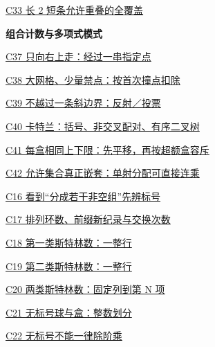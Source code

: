 \documentclass[10pt,a4paper]{article}
\begin{document}
\noindent\hyperref[C33]{C33 长 2 短条允许重叠的全覆盖\nobreak\hfill\pageref*{C33}}\par\vspace{1.5pt}
\par\vspace{3pt}\textbf{组合计数与多项式模式}\par
\noindent\hyperref[C37]{C37 只向右上走：经过一串指定点\nobreak\hfill\pageref*{C37}}\par\vspace{1.5pt}
\noindent\hyperref[C38]{C38 大网格、少量禁点：按首次撞点扣除\nobreak\hfill\pageref*{C38}}\par\vspace{1.5pt}
\noindent\hyperref[C39]{C39 不越过一条斜边界：反射／投票\nobreak\hfill\pageref*{C39}}\par\vspace{1.5pt}
\noindent\hyperref[C40]{C40 卡特兰：括号、非交叉配对、有序二叉树\nobreak\hfill\pageref*{C40}}\par\vspace{1.5pt}
\noindent\hyperref[C41]{C41 每盒相同上下限：先平移，再按超额盒容斥\nobreak\hfill\pageref*{C41}}\par\vspace{1.5pt}
\noindent\hyperref[C42]{C42 允许集合真正嵌套：单射分配可直接连乘\nobreak\hfill\pageref*{C42}}\par\vspace{1.5pt}
\noindent\hyperref[C16]{C16 看到“分成若干非空组”先辨标号\nobreak\hfill\pageref*{C16}}\par\vspace{1.5pt}
\noindent\hyperref[C17]{C17 排列环数、前缀新纪录与交换次数\nobreak\hfill\pageref*{C17}}\par\vspace{1.5pt}
\noindent\hyperref[C18]{C18 第一类斯特林数：一整行\nobreak\hfill\pageref*{C18}}\par\vspace{1.5pt}
\noindent\hyperref[C19]{C19 第二类斯特林数：一整行\nobreak\hfill\pageref*{C19}}\par\vspace{1.5pt}
\noindent\hyperref[C20]{C20 两类斯特林数：固定列到第 N 项\nobreak\hfill\pageref*{C20}}\par\vspace{1.5pt}
\noindent\hyperref[C21]{C21 无标号球与盒：整数划分\nobreak\hfill\pageref*{C21}}\par\vspace{1.5pt}
\noindent\hyperref[C22]{C22 无标号不能一律除阶乘\nobreak\hfill\pageref*{C22}}\par\vspace{1.5pt}
\end{document}
